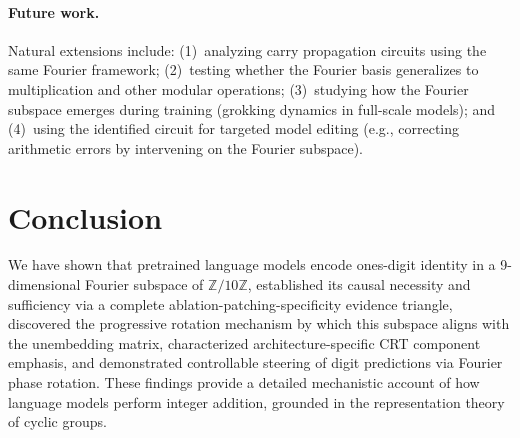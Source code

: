 \paragraph{Future work.} Natural extensions include: (1)~analyzing carry propagation circuits using the same Fourier framework; (2)~testing whether the Fourier basis generalizes to multiplication and other modular operations; (3)~studying how the Fourier subspace emerges during training (grokking dynamics in full-scale models); and (4)~using the identified circuit for targeted model editing (e.g., correcting arithmetic errors by intervening on the Fourier subspace).


\section{Conclusion}

We have shown that pretrained language models encode ones-digit identity in a 9-dimensional Fourier subspace of $\mathbb{Z}/10\mathbb{Z}$, established its causal necessity and sufficiency via a complete ablation-patching-specificity evidence triangle, discovered the progressive rotation mechanism by which this subspace aligns with the unembedding matrix, characterized architecture-specific CRT component emphasis, and demonstrated controllable steering of digit predictions via Fourier phase rotation. These findings provide a detailed mechanistic account of how language models perform integer addition, grounded in the representation theory of cyclic groups.
